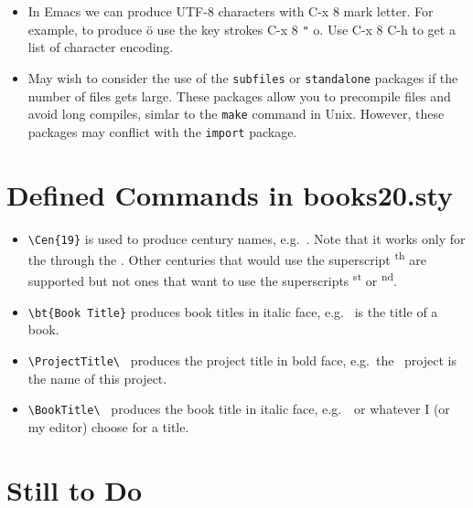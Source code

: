 \begin{itemize}
{  This will be useful when I create \LaTeXe\ files from the database
  which is in UTF-8 encoding.
}

\item In Emacs we can produce UTF-8 characters with C-x 8 mark letter.
  For example, to produce ö use the key strokes C-x 8 \verb|"| o. Use C-x 8 C-h
  to get a list of character encoding.
  
\item May wish to consider the use of the \texttt{subfiles} or
  \texttt{standalone} packages if the number of files gets
  large. These packages allow you to precompile files and avoid long
  compiles, simlar to the \texttt{make} command in Unix.  However,
  these packages may conflict with the \texttt{import} package.


\end{itemize}

\section{Defined Commands in books20.sty}

\begin{itemize}

\item \verb|\Cen{19}| is used to produce century names,
  e.g.\ . Note that it works only for the  through the
  . Other centuries that would use the superscript
  \textsuperscript{th} are supported but not ones that want to use the
  superscripts \textsuperscript{st} or \textsuperscript{nd}.

\item \verb|\bt{Book Title}| produces book titles in italic face,
e.g.\  is the title of a book.

\item \verb|\ProjectTitle\ | produces the project title in bold face,
  e.g.\ the \ProjectTitle\ project is the name of this project.

\item \verb|\BookTitle\ | produces the book title in italic face,
  e.g.\ \BookTitle\ or whatever I (or my editor) choose for a title.

\end{itemize}

\section{Still to Do}

